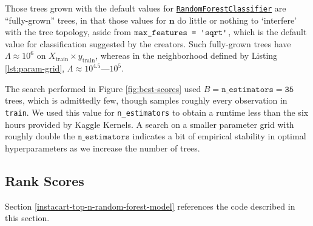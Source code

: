 \documentclass[11pt]{article}
\theoremstyle{definition}
\numberwithin{equation}{section}
\begin{document}
Those trees grown with the default values for 
\href{https://scikit-learn.org/stable/modules/generated/sklearn.ensemble.RandomForestClassifier.html\#sklearn.ensemble.RandomForestClassifier}{\texttt{RandomForestClassifier}}
are ``fully-grown'' trees, in that those values for $\mathbf{n}$ do little or nothing to `interfere' with the tree topology,
aside from $\texttt{max\_features = \textquotesingle{}sqrt\textquotesingle{}}$, 
which is the default value for classification suggested by the creators.
Such fully-grown trees have $\Lambda \approx 10^{6}$ on $X_\text{train} \times y_\text{train}$, whereas in the neighborhood defined by Listing \ref{lst:param-grid},
$\Lambda \approx 10^{4.5} \text{---} 10^{5}$.


The search performed in Figure \ref{fig:best-scores} used $B = \mathtt{n\_estimators} = \mathtt{35}$ trees, which is admittedly few, though samples roughly every observation in \texttt{\textquotesingle{}train\textquotesingle{}}. We used this value for \texttt{n\_estimators} to obtain a runtime less than the six hours provided by Kaggle Kernels. A search on a smaller parameter grid with roughly double the $\mathtt{n\_estimators}$ indicates a bit of empirical stability in optimal hyperparameters as we increase the number of trees.






\hypertarget{rank-scores}{%
  \subsection{Rank Scores}\label{rank-scores}}

Section \ref{instacart-top-n-random-forest-model} references the code described in this section.
\end{document}
